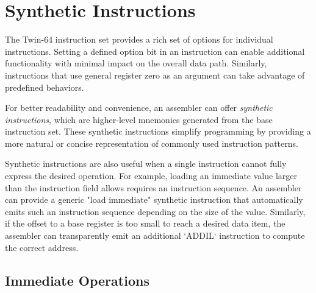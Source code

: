%
%
\chapter*{Synthetic Instructions}

The Twin-64 instruction set provides a rich set of options for individual instructions. Setting a defined option bit in an instruction can enable additional functionality with minimal impact on the overall data path. Similarly, instructions that use general register zero as an argument can take advantage of predefined behaviors. 

For better readability and convenience, an assembler can offer \emph{synthetic instructions}, which are higher-level mnemonics generated from the base instruction set. These synthetic instructions simplify programming by providing a more natural or concise representation of commonly used instruction patterns.

Synthetic instructions are also useful when a single instruction cannot fully express the desired operation. For example, loading an immediate value larger than the instruction field allows requires an instruction sequence. An assembler can provide a generic "load immediate" synthetic instruction that automatically emits such an instruction sequence depending on the size of the value. Similarly, if the offset to a base register is too small to reach a desired data item, the assembler can transparently emit an additional `ADDIL` instruction to compute the correct address.

\section*{Immediate Operations}

